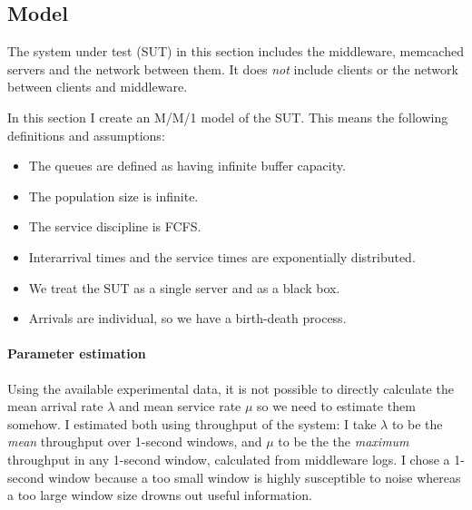 \documentclass[11pt]{article}
\begin{document}
\subsection{Model}
\label{sec:part1:model}

The system under test (SUT) in this section includes the middleware, memcached servers and the network between them. It does \emph{not} include clients or the network between clients and middleware.

In this section I create an M/M/1 model of the SUT. This means the following definitions and assumptions:
\begin{itemize}
	\item The queues are defined as having infinite buffer capacity.
	\item The population size is infinite.
	\item The service discipline is FCFS.
	\item Interarrival times and the service times are exponentially distributed.
	\item We treat the SUT as a single server and as a black box.
	\item Arrivals are individual, so we have a birth-death process.
\end{itemize}
 
\paragraph{Parameter estimation}

Using the available experimental data, it is not possible to directly calculate the mean arrival rate $\lambda$ and mean service rate $\mu$ so we need to estimate them somehow. I estimated both using throughput of the system: I take $\lambda$ to be the \emph{mean} throughput over 1-second windows, and $\mu$ to be the the \emph{maximum} throughput in any 1-second window, calculated from middleware logs. I chose a 1-second window because a too small window is highly susceptible to noise whereas a too large window size drowns out useful information.


\end{document}
